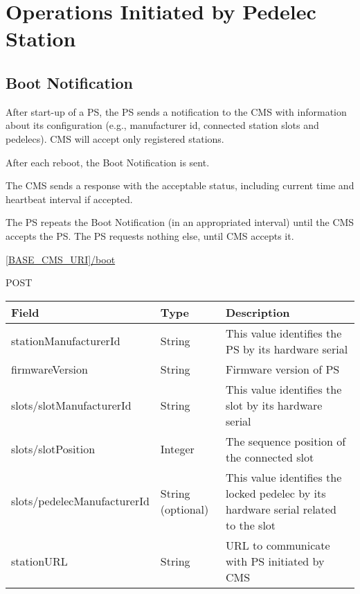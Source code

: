 \section{Operations Initiated by Pedelec Station}

\subsection{Boot Notification}

After start-up of a \acs{PS}, the \acs{PS} sends a notification to the \acs{CMS} with information about its configuration (e.g., manufacturer id, connected station slots and pedelecs). \acs{CMS} will accept only registered stations. 

After each reboot, the Boot Notification is sent.

The \acs{CMS} sends a response with the acceptable status, including current time and heartbeat interval if accepted.

The \acs{PS} repeats the Boot Notification (in an appropriated interval) until the \acs{CMS} accepts the \acs{PS}. The \acs{PS} requests nothing else, until \acs{CMS} accepts it.


 \url{[BASE_CMS_URI]/boot}

 POST

\begin{table}[!h]
\vspace{-7mm}
\begin{tabularx}{\linewidth}{ | l | l | X | }
  \hline
  \rowcolor{table-head}
  Field & Type & Description \\
  \hline
  stationManufacturerId & String 		& This value identifies the \acs{PS} by its hardware serial \\
  firmwareVersion			& String & Firmware version of \acs{PS}\\
  slots/slotManufacturerId 	& String & This value identifies the slot by its hardware serial \\
  slots/slotPosition			& Integer & The sequence position of the connected slot \\
  slots/pedelecManufacturerId & String (optional) & This value identifies the locked pedelec by its hardware serial related to the slot \\
  stationURL				& String & URL to communicate with \acs{PS} initiated by \acs{CMS}\\
    \hline
\end{tabularx}
\end{table}

